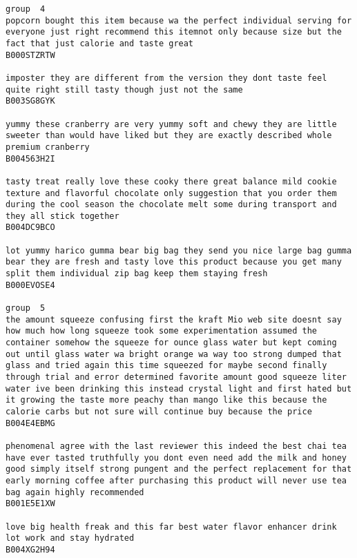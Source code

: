 \documentclass[11pt]{article}
\begin{document}
\begin{Verbatim}[commandchars=\\\{\}]
group  4
popcorn bought this item because wa the perfect individual serving for everyone just right recommend this itemnot only because size but the fact that just calorie and taste great
B000STZRTW

imposter they are different from the version they dont taste feel quite right still tasty though just not the same
B003SG8GYK

yummy these cranberry are very yummy soft and chewy they are little sweeter than would have liked but they are exactly described whole premium cranberry
B004563H2I

tasty treat really love these cooky there great balance mild cookie texture and flavorful chocolate only suggestion that you order them during the cool season the chocolate melt some during transport and they all stick together
B004DC9BCO

lot yummy harico gumma bear big bag they send you nice large bag gumma bear they are fresh and tasty love this product because you get many split them individual zip bag keep them staying fresh
B000EVOSE4

group  5
the amount squeeze confusing first the kraft Mio web site doesnt say how much how long squeeze took some experimentation assumed the container somehow the squeeze for ounce glass water but kept coming out until glass water wa bright orange wa way too strong dumped that glass and tried again this time squeezed for maybe second finally through trial and error determined favorite amount good squeeze liter water ive been drinking this instead crystal light and first hated but it growing the taste more peachy than mango like this because the calorie carbs but not sure will continue buy because the price
B004E4EBMG

phenomenal agree with the last reviewer this indeed the best chai tea have ever tasted truthfully you dont even need add the milk and honey good simply itself strong pungent and the perfect replacement for that early morning coffee after purchasing this product will never use tea bag again highly recommended
B001E5E1XW

love big health freak and this far best water flavor enhancer drink lot work and stay hydrated
B004XG2H94


\end{Verbatim}
\end{document}

